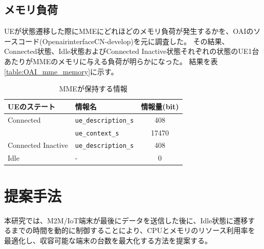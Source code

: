 \documentclass[a4j]{ujarticle}
\begin{document}
    \subsection{メモリ負荷}
    UEが状態遷移した際にMMEにどれほどのメモリ負荷が発生するかを、OAIのソースコード(OpenairinterfaceCN-develop)を元に調査した。
    その結果、Connected状態、Idle状態およびConnected Inactive状態それぞれの状態のUE1台あたりがMMEのメモリに与える負荷が明らかになった。
    結果を表\ref{table:OAI_mme_memory}に示す。
    \begin{table}[htbp]
      \centering
      \caption{MMEが保持する情報}
      \label{table:oai_source_memory}
      \begin{tabular}{l|l|c}
        \hline
        UEのステート  & 情報名 & 情報量(bit)  \\ \hline \hline
        Connected & \verb|ue_description_s| & 408 \\
        & \verb|ue_context_s| & 17470\\\hline
        Connected Inactive & \verb|ue_description_s| & 408 \\\hline
        Idle & - & 0 \\\hline
      \end{tabular}
    \end{table}
%




\clearpage
\section{提案手法}
  本研究では、M2M/IoT端末が最後にデータを送信した後に、Idle状態に遷移するまでの時間を動的に制御することにより、CPUとメモリのリソース利用率を最適化し、収容可能な端末の台数を最大化する方法を提案する。
\end{document}
